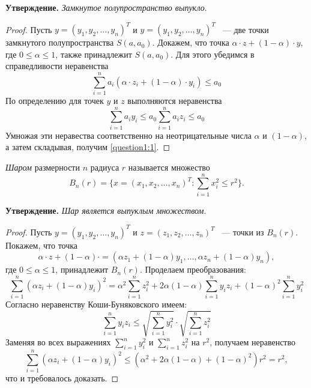 \documentclass[../main.tex]{subfiles}
\begin{document}
\textbf{Утверждение.} \emph{Замкнутое полупространство выпукло}.
\begin{proof}
	Пусть $y = (y_1,y_2,\dots,y_n)^T$ и $y = (y_1,y_2,\dots,y_n)^T$
	~--- две точки замкнутого полупространства $S(a, a_0)$.
	Докажем, что точка $\alpha \cdot z + (1 - \alpha) \cdot y$, 
	где $0 \leq \alpha \leq 1$, также принадлежит
	$S(a, a_0)$. Для этого убедимся в справедливости неравенства
	\begin{equation} 
		\label{question1:1}
		\sum_{i=1}^{n}a_i(\alpha \cdot z_i + (1-\alpha) \cdot y_i) \leq a_0
	\end{equation}
	По определению для точек $y$ и $z$ выполняются неравенства
	\begin{equation}
		\sum_{i=1}^{n}a_iy_i \leq a_0 
		\sum_{i=1}^{n}a_iz_i \leq a_0
	\end{equation}
	Умножая эти неравества соответственно на неотрицательные числа
	$\alpha$ и $(1 - \alpha)$, а затем складывая, получим \ref{question1:1}.
\end{proof}

\emph{Шаром} размерности $n$ радиуса $r$ называется множество
\begin{equation}
	B_n(r)=\{x=(x_1,x_2,\dots,x_n)^T : \sum_{i=1}^{n}x_i^2 \leq r^2\}.
\end{equation}

\textbf{Утверждение.} \emph{Шар является выпуклым множеством}.
\begin{proof}
	Пусть $y = (y_1,y_2,\dots,y_n)^T$ и $z = (z_1,z_2,\dots,z_n)^T$
	~--- точки из $B_n(r)$. Покажем, что точка
	\[ 
		\alpha \cdot z + (1 - \alpha) \cdot = 
		(\alpha z_1 + (1-\alpha)y_1, \dots, \alpha z_n + (1-\alpha)y_n),
	\]
	где $0 \leq \alpha \leq 1$, принадлежит $B_n(r)$. Проделаем
	преобразования:
	\[
		\sum_{i=1}^n(\alpha z_i + (1-\alpha)y_i)^2 = 
		\alpha^2\sum_{i=1}^nz_i^2 + 2\alpha(1-\alpha)\sum_{i=1}^ny_iz_i 
		+ (1-\alpha)^2\sum_{i=1}^ny_i^2
	\]
	Согласно неравенству Коши-Буняковского имеем:
	\[
		\sum_{i=1}^ny_iz_i\leq\sqrt{\sum_{i=1}^ny_i^2} \cdot
		\sqrt{\sum_{i=1}^nz_i^2}
	\]
	Заменяя во всех выражениях 
	$\sum_{i=1}^ny_i^2$ и $\sum_{i=1}^nz_i^2$
	на $r^2$, получаем неравенство
	\[
		\sum_{i=1}^n(\alpha z_i + (1-\alpha)y_i)^2 \leq 
		(\alpha^2 + 2\alpha(1-\alpha)
		+ (1-\alpha)^2)r^2 = r^2,
	\]
	что и требовалось доказать.
\end{proof}
\end{document}

